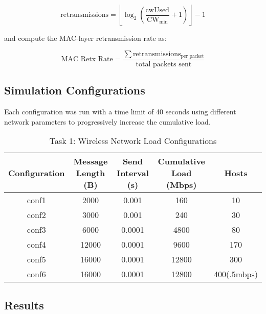 \documentclass{article}
\begin{document}
\[

\text{retransmissions} = \left\lfloor \log_2\!\left(\frac{\text{cwUsed}}{\text{CW}_{\min}} + 1\right) \right\rfloor - 1

\]

and compute the MAC-layer retransmission rate as:

\[

\text{MAC Retx Rate} = \frac{\sum \text{retransmissions}_{\text{per packet}}}{\text{total packets sent}}

\]

\subsection{Simulation Configurations}

Each configuration was run with a time limit of 40 seconds using different network parameters to progressively increase the cumulative load.

\begin{table}[H]

\centering

\caption{Task 1: Wireless Network Load Configurations}

\begin{tabular}{|c|c|c|c|c|}

\hline

Configuration & Message Length (B) & Send Interval (s) & Cumulative Load (Mbps) & Hosts \\

\hline

conf1 & 2000 & 0.001 & 160 & 10 \\

conf2 & 3000 & 0.001 & 240 & 30 \\

conf3 & 6000 & 0.0001 & 4800 & 80 \\

conf4 & 12000 & 0.0001 & 9600 & 170 \\

conf5 & 16000 & 0.0001 & 12800 & 300 \\

conf6 & 16000 & 0.0001 & 12800 & 400(.5mbps) \\

\hline

\end{tabular}

\end{table}

\subsection{Results}
\end{document}
